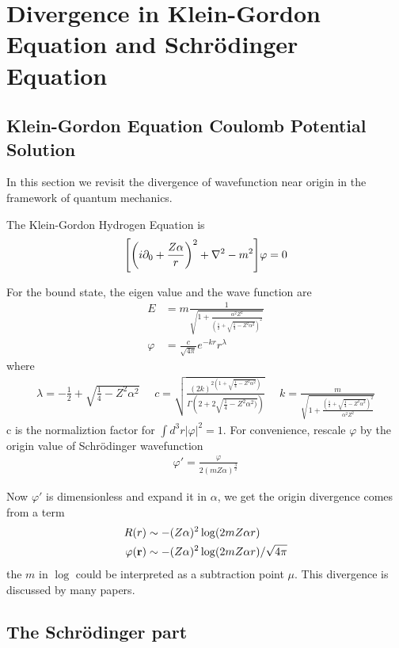 \documentclass[aps,prd,preprint,showkeys,10pt]{revtex4-1}
\renewcommand{\a}{\alpha}
\begin{document}
\section{Divergence in Klein-Gordon Equation and Schr\"odinger Equation\label{sec:qm}}
\subsection{Klein-Gordon Equation Coulomb Potential Solution}
In this section we revisit the divergence of wavefunction near origin in the framework of quantum mechanics.

The Klein-Gordon Hydrogen Equation is
\begin{align}
	\bqty{\pqty{i\partial_0+\frac{Z\alpha}{r}}^2+\nabla^2-m^2}\varphi=0
\end{align}

For the bound state, the eigen value and the wave function are\cite{Greiner2000}
\begin{align}
	E    & =m\frac{1}{\sqrt{1+\frac{\alpha^2 Z^2}{(\frac{1}{2}+\sqrt{\frac{1}{4}-Z^2\alpha^2})^2}}} \\
	\varphi & =\frac{c}{\sqrt{4\pi}}e^{-kr}r^\lambda
\end{align}
where
\begin{align}
	\lambda=-\frac{1}{2}+\sqrt{\frac{1}{4}-Z^2\alpha^2}\ \ \ \ \ \
	c=\sqrt{\frac{(2k)^{2(1+\sqrt{\frac{1}{4}-Z^2\alpha^2})}}{\Gamma(2+2\sqrt{\frac{1}{4}-Z^2\alpha^2)})}}\ \ \ \ \ \
	k=\frac{m}{\sqrt{1+\frac{(\frac{1}{2}+\sqrt{\frac{1}{4}-Z^2\alpha^2})^2}{\alpha^2Z^2}}}
\end{align}
c is the normaliztion factor for $\int d^3r|\varphi|^2=1$. For convenience, rescale $\varphi$ by the origin value of Schr\"odinger wavefunction
\begin{align}
	\varphi '=\frac{\varphi}{2(mZ\alpha)^\frac{3}{2}}
\end{align}

Now $\varphi '$ is dimensionless and expand it in $\alpha$, we get the origin divergence comes from a term
\begin{align}
	R(r)         & \sim-(Z\alpha)^2\log(2m Z \a r)             \\
	\varphi(\vb{r}) & \sim-(Z\alpha)^2\log(2m Z \a r)/\sqrt{4\pi}
\end{align}
the $m$ in $\log$ could be interpreted as a subtraction point $\mu$. This divergence is discussed by many papers\cite{Chen2007,Chen2009}.

\subsection{The Schr\"odinger part}
\end{document}
